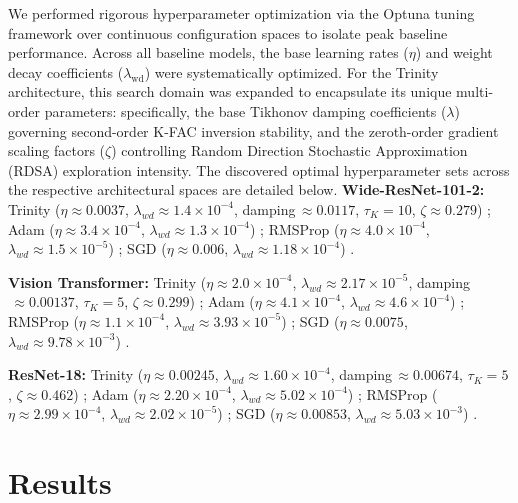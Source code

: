 \documentclass[conference]{IEEEtran}
\begin{document}

We performed rigorous hyperparameter optimization via the Optuna tuning framework over continuous configuration spaces to isolate peak baseline performance. Across all baseline models, the base learning rates ($\eta$) and weight decay coefficients ($\lambda_{\mathrm{wd}}$) were systematically optimized. For the Trinity architecture, this search domain was expanded to encapsulate its unique multi-order parameters: specifically, the base Tikhonov damping coefficients ($\lambda$) governing second-order K-FAC inversion stability, and the zeroth-order gradient scaling factors ($\zeta$) controlling Random Direction Stochastic Approximation (RDSA) exploration intensity. The discovered optimal hyperparameter sets across the respective architectural spaces are detailed below.
\smallskip
\noindent\textbf{Wide-ResNet-101-2:}
Trinity ($\eta\!\approx\!0.0037$, $\lambda_{wd}\!\approx\!1.4{\times}10^{-4}$,
damping$\,\approx\!0.0117$, $\tau_{K}\!=\!10$, $\zeta\!\approx\!0.279$)
;
Adam ($\eta\!\approx\!3.4{\times}10^{-4}$,
$\lambda_{wd}\!\approx\!1.3{\times}10^{-4}$) ;
RMSProp ($\eta\!\approx\!4.0{\times}10^{-4}$,
$\lambda_{wd}\!\approx\!1.5{\times}10^{-5}$) ;
SGD ($\eta\!\approx\!0.006$,
$\lambda_{wd}\!\approx\!1.18{\times}10^{-4}$) .

\smallskip
\noindent\textbf{Vision Transformer:}
Trinity ($\eta\!\approx\!2.0{\times}10^{-4}$,
$\lambda_{wd}\!\approx\!2.17{\times}10^{-5}$,
damping$\,\approx\!0.00137$, $\tau_{K}\!=\!5$, $\zeta\!\approx\!0.299$)
;
Adam ($\eta\!\approx\!4.1{\times}10^{-4}$,
$\lambda_{wd}\!\approx\!4.6{\times}10^{-4}$) ;
RMSProp ($\eta\!\approx\!1.1{\times}10^{-4}$,
$\lambda_{wd}\!\approx\!3.93{\times}10^{-5}$) ;
SGD ($\eta\!\approx\!0.0075$, $\lambda_{wd}\!\approx\!9.78{\times}10^{-3}$)
.

\smallskip
\noindent\textbf{ResNet-18:}
Trinity ($\eta\!\approx\!0.00245$,
$\lambda_{wd}\!\approx\!1.60{\times}10^{-4}$,
damping$\,\approx\!0.00674$, $\tau_{K}\!=\!5$, $\zeta\!\approx\!0.462$)
;
Adam ($\eta\!\approx\!2.20{\times}10^{-4}$,
$\lambda_{wd}\!\approx\!5.02{\times}10^{-4}$) ;
RMSProp ($\eta\!\approx\!2.99{\times}10^{-4}$,
$\lambda_{wd}\!\approx\!2.02{\times}10^{-5}$) ;
SGD ($\eta\!\approx\!0.00853$,
$\lambda_{wd}\!\approx\!5.03{\times}10^{-3}$) .

\section{Results}
\label{sec:results}
\end{document}
